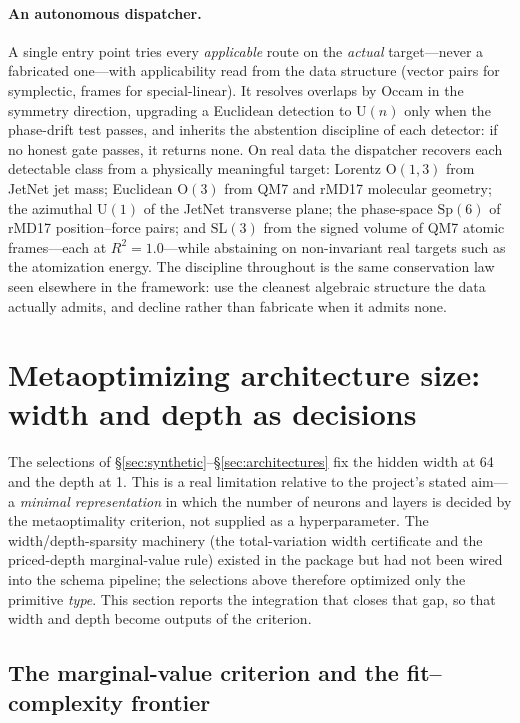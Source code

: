 \documentclass[11pt]{article}
\begin{document}
\paragraph{An autonomous dispatcher.} A single entry point tries every \emph{applicable} route on the
\emph{actual} target---never a fabricated one---with applicability read from the data structure
(vector pairs for symplectic, frames for special-linear). It resolves overlaps by Occam in the
symmetry direction, upgrading a Euclidean detection to $\mathrm{U}(n)$ only when the phase-drift test
passes, and inherits the abstention discipline of each detector: if no honest gate passes, it returns
none. On real data the dispatcher recovers each detectable class from a physically meaningful target:
Lorentz $\mathrm{O}(1,3)$ from JetNet jet mass; Euclidean $\mathrm{O}(3)$ from QM7 and rMD17 molecular
geometry; the azimuthal $\mathrm{U}(1)$ of the JetNet transverse plane; the phase-space
$\mathrm{Sp}(6)$ of rMD17 position--force pairs; and $\mathrm{SL}(3)$ from the signed volume of QM7
atomic frames---each at $R^2=1.0$---while abstaining on non-invariant real targets such as the
atomization energy. The discipline throughout is the same conservation law seen elsewhere in the
framework: use the cleanest algebraic structure the data actually admits, and decline rather than
fabricate when it admits none.


\section{Metaoptimizing architecture size: width and depth as decisions}
\label{sec:size}

The selections of \S\ref{sec:synthetic}--\S\ref{sec:architectures} fix the hidden width at 64
and the depth at 1. This is a real limitation relative to the project's stated aim---a
\emph{minimal representation} in which the number of neurons and layers is decided by the
metaoptimality criterion, not supplied as a hyperparameter. The width/depth-sparsity machinery
(the total-variation width certificate and the priced-depth marginal-value rule) existed in the
package but had not been wired into the schema pipeline; the selections above therefore
optimized only the primitive \emph{type}. This section reports the integration that closes that
gap, so that width and depth become outputs of the criterion.

\subsection{The marginal-value criterion and the fit--complexity frontier}
\label{sec:frontier}
\end{document}

